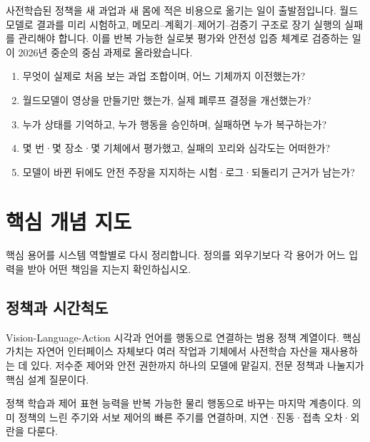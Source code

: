 \documentclass[11pt,openany]{book}
\begin{document}
\begin{profbox}
사전학습된 정책을 새 과업과 새 몸에 적은 비용으로 옮기는 일이 출발점입니다. 월드모델로 결과를 미리 시험하고, 메모리--계획기--제어기--검증기 구조로 장기 실행의 실패를 관리해야 합니다. 이를 반복 가능한 실로봇 평가와 안전성 입증 체계로 검증하는 일이 2026년 중순의 중심 과제로 올라왔습니다.
\end{profbox}

\begin{fieldbox}
\begin{enumerate}
  \item 무엇이 실제로 처음 보는 과업 조합이며, 어느 기체까지 이전했는가?
  \item 월드모델이 영상을 만들기만 했는가, 실제 폐루프 결정을 개선했는가?
  \item 누가 상태를 기억하고, 누가 행동을 승인하며, 실패하면 누가 복구하는가?
  \item 몇 번·몇 장소·몇 기체에서 평가했고, 실패의 꼬리와 심각도는 어떠한가?
  \item 모델이 바뀐 뒤에도 안전 주장을 지지하는 시험·로그·되돌리기 근거가 남는가?
\end{enumerate}
\end{fieldbox}

\cleardoublepage
\part*{핵심 개념 지도}

핵심 용어를 시스템 역할별로 다시 정리합니다. 정의를 외우기보다 각 용어가 어느 입력을 받아 어떤 책임을 지는지 확인하십시오.

\chapter*{정책과 시간척도}

\begin{termcard}{Vision-Language-Action}
시각과 언어를 행동으로 연결하는 범용 정책 계열이다. 핵심 가치는 자연어 인터페이스 자체보다 여러 작업과 기체에서 사전학습 자산을 재사용하는 데 있다. 저수준 제어와 안전 권한까지 하나의 모델에 맡길지, 전문 정책과 나눌지가 핵심 설계 질문이다.
\end{termcard}

\begin{termcard}{정책 학습과 제어}
표현 능력을 반복 가능한 물리 행동으로 바꾸는 마지막 계층이다. 의미 정책의 느린 주기와 서보 제어의 빠른 주기를 연결하며, 지연·진동·접촉 오차·외란을 다룬다.
\end{termcard}
\end{document}
